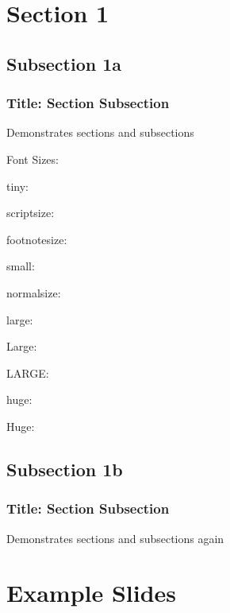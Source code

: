\section{Section 1}\label{Sec1}


\subsection{Subsection 1a}\label{Sub1a}

\begin{frame}\frametitle{Title: Section \thesection Subsection \thesubsection}
Demonstrates sections and subsections

\begin{block}{Font Sizes: }

tiny: \thefontsize\tiny

scriptsize: \thefontsize\scriptsize

footnotesize: \thefontsize\footnotesize

small: \thefontsize\small

normalsize: \thefontsize\normalsize

large: \thefontsize\large

Large: \thefontsize\Large

LARGE: \thefontsize\LARGE

huge: \thefontsize\huge

Huge: \thefontsize\Huge
\end{block}

\end{frame}

\subsection{Subsection 1b}

\begin{frame}\frametitle{Title: Section \thesection Subsection \thesubsection}
  Demonstrates sections and subsections again
\end{frame}

\section{Example Slides}



